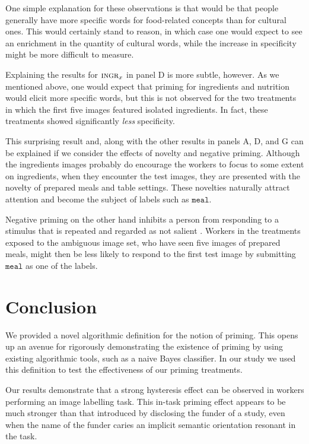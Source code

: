 \documentclass[letterpaper]{article}
\begin{document}
One simple explanation for these observations is that  would be that people 
generally have more specific words for food-related concepts than for cultural 
ones.  This would certainly stand to reason, in which case one would expect
to see an enrichment in the quantity of cultural words, while the increase
in specificity might be more difficult to measure.

Explaining the results for $\textsc{ingr}_{x}$ in panel D is more subtle,
however.  As we mentioned above, one would expect that priming for ingredients
and nutrition would elicit more specific words, but this is not observed for
the two treatments in which the first five images featured isolated 
ingredients.  In fact, these treatments showed significantly \textit{less}
specificity.  

This surprising result and, along with the other results in panels A, D, and G
can be explained if we consider the effects of novelty and negative priming.
Although the ingredients images probably do encourage the workers to focus
to some extent on ingredients, when they encounter the test images, they are
presented with the novelty of prepared meals and table settings.  These 
novelties naturally attract attention and become the subject of labels such
as $\texttt{meal}$.  

Negative priming on the other hand inhibits a person from responding to a
stimulus that is repeated and regarded as not salient \cite{versace2001negative}.  
Workers in the
treatments exposed to the ambiguous image set, who have seen five images
of prepared meals, might then be less likely to respond to the first test
image by submitting $\texttt{meal}$ as one of the labels.

\section{Conclusion}

We provided a novel algorithmic definition for the notion of
priming.  This opens up an avenue for rigorously demonstrating the existence 
of priming by using existing algorithmic tools, such as a naive Bayes 
classifier.  In our study we used this definition to test the effectiveness
of our priming treatments.

Our results demonstrate that a strong hysteresis effect can be observed in 
workers performing an image labelling task.  This in-task priming effect 
appears to be much stronger than that introduced by disclosing the funder
of a study, even when the name of the funder caries an implicit semantic
orientation resonant in the task.
\end{document}
